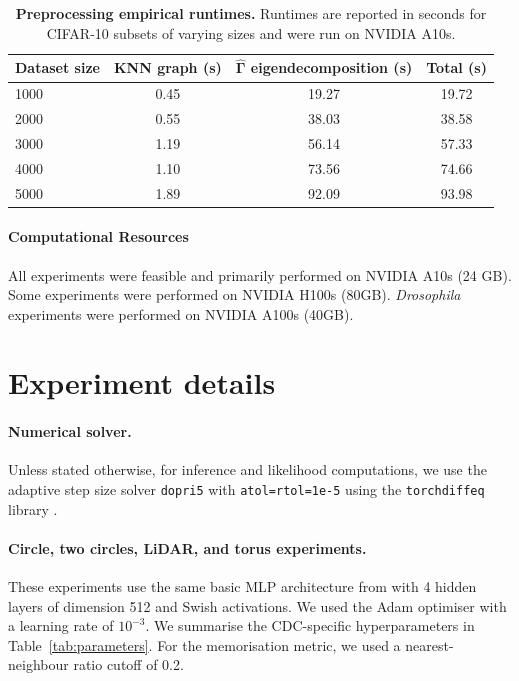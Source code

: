 \documentclass{article} %
\newcommand{\G}{\widehat{\mathbf{\Gamma}}}
\begin{document}
\begin{table}[h]
\centering
\caption{\textbf{Preprocessing empirical runtimes.}
Runtimes are reported in seconds for CIFAR-10 subsets of varying sizes and were run on NVIDIA A10s.}
\begin{tabular}{lccc}
\toprule
\textbf{Dataset size} & \textbf{KNN graph (s)} & \textbf{$\G$ eigendecomposition (s)} & \textbf{Total (s)} \\
\midrule
1000 & 0.45 & 19.27 & 19.72 \\
2000 & 0.55 & 38.03 & 38.58 \\
3000 & 1.19 & 56.14 & 57.33 \\
4000 & 1.10 & 73.56 & 74.66 \\
5000 & 1.89 & 92.09 & 93.98 \\
\bottomrule
\end{tabular}
\label{tab:preprocessing_runtimes}
\end{table}

\paragraph{Computational Resources}
All experiments were feasible and primarily performed on NVIDIA A10s (24 GB). 
Some experiments were performed on NVIDIA H100s (80GB). 
\textit{Drosophila} experiments were performed on NVIDIA A100s (40GB). 

\section{Experiment details}\label{section:experiment_details}

\paragraph{Numerical solver.} Unless stated otherwise, for inference and likelihood computations, we use the adaptive step size solver \texttt{dopri5} with \texttt{atol=rtol=1e-5} using the \texttt{torchdiffeq} library \citep{chen_neural_2019}.


\paragraph{Circle, two circles, LiDAR, and torus experiments.}

These experiments use the same basic MLP architecture from \cite{lipman_flow_2024} with 4 hidden layers of dimension 512 and Swish activations.
We used the Adam optimiser with a learning rate of $10^{-3}$.
We summarise the CDC-specific hyperparameters in Table~\ref{tab:parameters}.
For the memorisation metric, we used a nearest-neighbour ratio cutoff of 0.2. 
\end{document}
